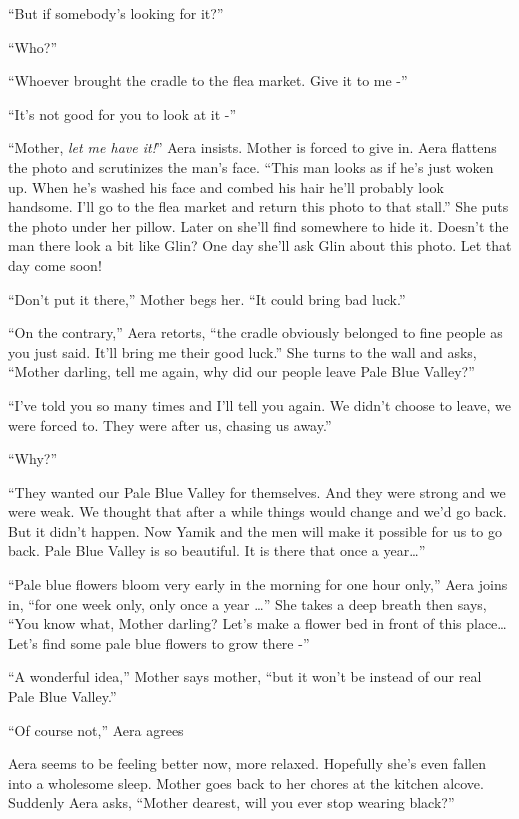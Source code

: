 \documentclass[twoside,11pt]{book}
\begin{document}
``But if somebody's looking for it?''

``Who?''

``Whoever brought the cradle to the flea market. Give it to me -''

``It's not good for you to look at it -''

``Mother, \textit{let me have it!}'' Aera insists. Mother is forced to give in. Aera flattens
the photo and scrutinizes the man's face. ``This man looks as if he's just woken up. When he's washed his
face and combed his hair he'll probably look handsome. I'll go to the flea market and return this photo to that
stall.'' She puts the photo under her pillow. Later on she'll find somewhere to hide it. Doesn't the man
there look a bit like Glin? One day she'll ask Glin about this photo. Let that day come soon!

``Don't put it there,'' Mother begs her. ``It could bring bad
luck.''

``On the contrary,'' Aera retorts, ``the cradle obviously belonged to fine people
as you just said. It'll bring me their good luck.'' She turns to the wall and asks, ``Mother
darling, tell me again, why did our people leave Pale Blue Valley?''

``I've told you so many times and I'll tell you again. We didn't choose to leave, we were forced to. They
were after us, chasing us away.''

``Why?''

``They wanted our Pale Blue Valley for themselves.  And they were strong and we were weak. We thought that
after a while things would change and we'd go back. But it didn't happen. Now Yamik and the men will make it possible
for us to go back. Pale Blue Valley is so beautiful. It is there that once a year{\dots}''

 ``Pale blue flowers bloom very early in the morning for one hour only,'' Aera joins in, ``for one week
only, only once a year {\dots}'' She takes a deep breath then says, ``You know what, Mother
darling? Let's make a flower bed in front of this place{\dots} Let's find some pale blue flowers to grow there
-''

``A wonderful idea,'' Mother says mother, ``but it won't be instead of our real
Pale Blue Valley.''

``Of course not,'' Aera agrees

 Aera seems to be feeling better now, more relaxed. Hopefully she's even fallen into a wholesome sleep. Mother goes
back to her chores at the kitchen alcove. Suddenly Aera asks, ``Mother dearest, will you ever stop wearing
black?''
\end{document}
